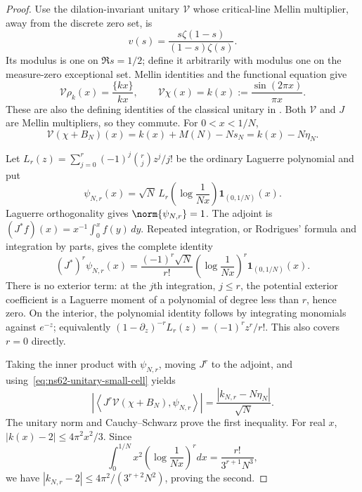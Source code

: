 \begin{proof}
Use the dilation-invariant unitary $\mathcal V$ whose critical-line
Mellin multiplier, away from the discrete zero set, is
\[
 v(s)=\frac{s\zeta(1-s)}{(1-s)\zeta(s)}.
\]
Its modulus is one on $\Re s=1/2$; define it arbitrarily with modulus
one on the measure-zero exceptional set. Mellin identities and the
functional equation give
\[
 \mathcal V\rho_k(x)=\frac{\{kx\}}{kx},\qquad
 \mathcal V\chi(x)=k(x):=\frac{\sin(2\pi x)}{\pi x}.
\]
These are also the defining identities of the classical unitary in
\cite[Section 4]{BaezDuarte2000Arithmetic}. Both $\mathcal V$ and $J$
are Mellin multipliers, so they commute. For $0<x<1/N$,
\begin{equation}
 \mathcal V(\chi+B_N)(x)=k(x)+M(N)-Ns_N=k(x)-N\eta_N.
 \label{eq:ns62-unitary-small-cell}
\end{equation}

Let $L_r(z)=\sum_{j=0}^r(-1)^j\binom rj z^j/j!$ be the ordinary
Laguerre polynomial and put
\[
 \psi_{N,r}(x)=\sqrt N\,
       L_r\left(\log\frac1{Nx}\right)\mathbf1_{(0,1/N)}(x).
\]
Laguerre orthogonality \cite[Table 18.3.1]{DLMFLaguerre} gives
$\norm{\psi_{N,r}}=1$. The adjoint is
$(J^*f)(x)=x^{-1}\int_0^x f(y)\,dy$. Repeated integration, or
Rodrigues' formula and integration by parts, gives the complete
identity
\begin{equation}
 (J^*)^r\psi_{N,r}(x)=
 \frac{(-1)^r\sqrt N}{r!}
       \left(\log\frac1{Nx}\right)^r\mathbf1_{(0,1/N)}(x).
 \label{eq:ns62-adjoint-laguerre}
\end{equation}
There is no exterior term: at the $j$th integration, $j\leq r$,
the potential exterior coefficient is a Laguerre moment of a
polynomial of degree less than $r$, hence zero. On the interior,
the polynomial identity follows by integrating monomials against
$e^{-z}$; equivalently $(1-\partial_z)^{-r}L_r(z)=(-1)^rz^r/r!$.
This also covers $r=0$ directly.

Taking the inner product with $\psi_{N,r}$, moving $J^r$ to the
adjoint, and using~\eqref{eq:ns62-unitary-small-cell} yields
\[
 \left|\left\langle J^r\mathcal V(\chi+B_N),\psi_{N,r}\right\rangle\right|
       =\frac{|k_{N,r}-N\eta_N|}{\sqrt N}.
\]
The unitary norm and Cauchy--Schwarz prove the first inequality.
For real $x$, $|k(x)-2|\leq4\pi^2x^2/3$. Since
\[
 \int_0^{1/N}x^2\left(\log\frac1{Nx}\right)^r dx
        =\frac{r!}{3^{r+1}N^3},
\]
we have $|k_{N,r}-2|\leq4\pi^2/(3^{r+2}N^2)$, proving the second.


\end{proof}
